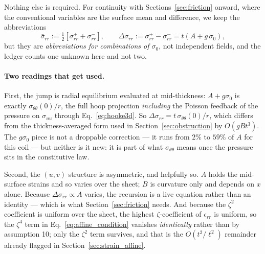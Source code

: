 \documentclass[11pt]{article}
\begin{document}
Nothing else is required. For continuity with
Sections~\ref{sec:friction} onward, where the conventional variables are the
surface mean and difference, we keep the abbreviations
\begin{equation}\label{eq:srr_conventions}
    \bar\sigma_{rr} := \tfrac12\left[\sigma_{rr}^{+}+\sigma_{rr}^{-}\right],
    \qquad
    \Delta\sigma_{rr} := \sigma_{rr}^{+}-\sigma_{rr}^{-}
      = t\left(A + g\,\sigma_{0}\right),
\end{equation}
but they are \emph{abbreviations for combinations of $\sigma_{0}$}, not
independent fields, and the ledger counts one unknown here and not two.

\paragraph{Two readings that get used.} First, the jump is radial equilibrium
evaluated at mid-thickness: $A + g\sigma_{0}$ is exactly
$\sigma_{\theta\theta}(0)/r$, the full hoop projection \emph{including} the
Poisson feedback of the pressure on $\sigma_{uu}$ through
Eq.~\eqref{eq:hooke3d}. So $\Delta\sigma_{rr} = t\,\sigma_{\theta\theta}(0)/r$,
which differs from the thickness-averaged form used in
Section~\ref{sec:obstruction} by $O\!\left(g B t^{3}\right)$. The $g\sigma_{0}$
piece is not a droppable correction --- it runs from $2\%$ to $59\%$ of $A$ for
this coil --- but neither is it new: it is part of what $\sigma_{\theta\theta}$
means once the pressure sits in the constitutive law.

Second, the $\left(u,v\right)$ structure is asymmetric, and helpfully so. $A$
holds the mid-surface strains and so varies over the sheet; $B$ is curvature only
and depends on $x$ alone. Because $\Delta\sigma_{rr} \propto A$ varies, the
recursion is a live equation rather than an identity --- which is what
Section~\ref{sec:friction} needs. And because the $\zeta^{2}$ coefficient is
uniform over the sheet, the highest $\zeta$-coefficient of $\epsilon_{rr}$ is
uniform, so the $\zeta^{4}$ term in Eq.~\eqref{eq:affine_condition} vanishes
\emph{identically} rather than by assumption 10; only the $\zeta^{2}$ term
survives, and that is the $O\!\left(t^{2}/\ell^{2}\right)$ remainder already
flagged in Section~\ref{sec:strain_affine}.
\end{document}

